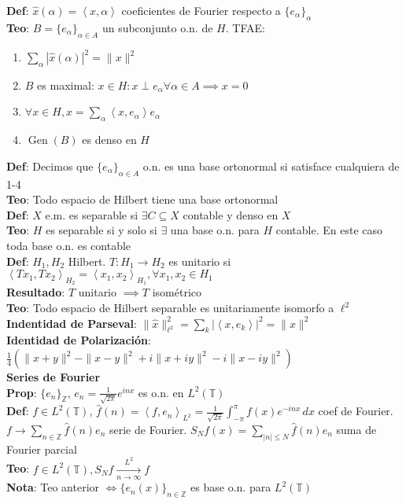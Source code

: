 \documentclass[9pt]{extarticle}
\newcommand{\Z}{\mathbb{Z}}
\newcommand{\T}{\mathbb{T}}
\newcommand{\inn}[1]{\left\langle #1\right\rangle}
\begin{document}
\begin{multicols*}{2}
\textbf{Def}: $\hat x(\alpha)=\inn{x,\alpha}$ coeficientes de Fourier respecto a $\{e_\alpha\}_\alpha$\\
\textbf{Teo}: $B=\{e_\alpha\}_{\alpha\in A}$ un subconjunto o.n. de $H$. TFAE:
\begin{enumerate}
	\item $\sum_\alpha |\hat x(\alpha)|^2=\|x\|^2$
	\item $B$ es maximal: $x\in H:x\perp e_\alpha\forall\alpha\in A\implies x=0$
	\item $\forall x\in H,x=\sum_\alpha \inn{x,e_\alpha}e_\alpha$
	\item $\operatorname{Gen}(B)$ es denso en $H$
\end{enumerate}
\textbf{Def}: Decimos que $\{e_\alpha\}_{\alpha\in A}$ o.n. es una base ortonormal si satisface cualquiera de 1-4\\
\textbf{Teo}: Todo espacio de Hilbert tiene una base ortonormal\\
\textbf{Def}: $X$ e.m. es separable si $\exists C\subseteq X$ contable y denso en $X$\\
\textbf{Teo}: $H$ es separable si y solo si $\exists$ una base o.n. para $H$ contable. En este caso toda base o.n. es contable\\
\textbf{Def}: $H_1,H_2$ Hilbert. $T:H_1\to H_2$ es unitario si $\inn{Tx_1,Tx_2}_{H_2}=\inn{x_1,x_2}_{H_1},\forall x_1,x_2\in H_1$\\
\textbf{Resultado}: $T$ unitario $\implies T$ isométrico\\
\textbf{Teo}: Todo espacio de Hilbert separable es unitariamente isomorfo a $\ell^2$\\
\textbf{Indentidad de Parseval}: $\|\hat x\|_{\ell^2}^2=\sum_k |\inn{x,e_k}|^2=\|x\|^2$\\
\textbf{Identidad de Polarización}: $\frac{1}{4}(\|x+y\|^2-\|x-y\|^2+i\|x+iy\|^2-i\|x-iy\|^2)$\\
\large\textbf{Series de Fourier}\\\normalsize
\textbf{Prop}: $\{e_n\}_\Z$, $e_n=\frac{1}{\sqrt{2\pi}}e^{inx}$ es o.n. en $L^2(\T)$\\
\textbf{Def}: $f\in L^2(\T)$, $\hat f(n)=\inn{f,e_n}_{L^2}=\frac{1}{\sqrt{2\pi}} \int_{-\pi}^\pi f(x)e^{-inx}\,dx$ coef de Fourier. $f\to \sum_{n\in\Z}\hat f(n)e_n$ serie de Fourier. $S_N f(x)=\sum_{|n|\leq N}\hat f(n)e_n$ suma de Fourier parcial\\
\textbf{Teo}: $f\in L^2(\T), S_Nf\xrightarrow[n\to\infty]{L^2}f$\\
\textbf{Nota}: Teo anterior $\iff \{e_n(x)\}_{n\in\Z}$ es base o.n. para $L^2(\T)$\\

\end{multicols*}
\end{document}
